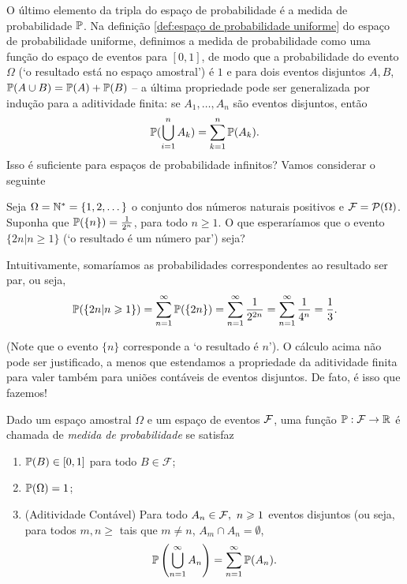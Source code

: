 O último elemento da tripla do espaço de probabilidade é a medida de probabilidade $\mathbb{P}$.
Na definição \ref{def:espaço de probabilidade uniforme} do espaço de probabilidade uniforme, definimos a medida de probabilidade como uma função do espaço de eventos para $[0,1]$, de modo que a probabilidade do evento $\Omega$ (`o resultado está no espaço amostral') é $1$ e para dois eventos disjuntos $A,B$, $\mathbb{P}(A\cup B)=\mathbb{P}(A)+\mathbb{P}(B)$ -- a última propriedade pode ser generalizada por indução para a aditividade finita: se $A_1,\dots,A_n$ são eventos disjuntos, então
\[
\mathbb{P}(\bigcup_{i=1}^n A_k) = \sum_{k=1}^n \mathbb{P}(A_k).
\]
Isso é suficiente para espaços de probabilidade infinitos? Vamos considerar o seguinte
\begin{example}
Seja $\Omega=\mathbb{N}^*=\{1,2,\dots\}$ o conjunto dos números naturais positivos e $\mathcal F=\mathcal{P}(\Omega)$. Suponha que $\mathbb{P}(\{n\}) = \frac{1}{2^n}$, para todo $n\geq 1$. O que esperaríamos que o evento $\{ 2n|n\geq 1\}$ (`o resultado é um número par') seja?

Intuitivamente, somaríamos as probabilidades correspondentes ao resultado ser par, ou seja,
\[
\mathbb{P}(\{2n|n\geqslant 1\}) = \sum_{n=1}^\infty \mathbb{P}(\{2n\}) = \sum_{n=1}^\infty \frac{1}{2^{2n}} = \sum_{n=1}^\infty \frac{1}{4^n} = \frac{1}{3}.
\]

(Note que o evento $\{n\}$ corresponde a `o resultado é $n$'). O cálculo acima não pode ser justificado, a menos que estendamos a propriedade da aditividade finita para valer também para uniões contáveis de eventos disjuntos. De fato, é isso que fazemos!
\end{example}

\begin{definition}
\label{def:medidadeprob}
Dado um espaço amostral $ \Omega $ e um espaço de eventos $ \mathcal F $, uma função $ \mathbb{P}:\mathcal F\to\mathbb{R} $ é chamada de \emph{medida de probabilidade} se satisfaz
        \begin{enumerate}[$ (i) $]
	    \item $ \mathbb{P}(B) \in [0,1] $ para todo $ B \in \mathcal{F} $;
            \item $\mathbb{P}(\Omega)=1$;
            \item (Aditividade Contável) Para todo $A_n\in\mathcal F,\ n\geqslant 1$ eventos disjuntos (ou seja, para todos $m,n\geq$ tais que $m\neq n$, $A_m\cap A_n = \emptyset$, 
            \begin{equation}
            \label{property: aditividadecountable}
                \mathbb{P}\left(\bigcup_{n=1}^\infty A_n \right) = \sum_{n=1}^\infty \mathbb{P}(A_n).
            \end{equation}
        \end{enumerate}
\end{definition}


